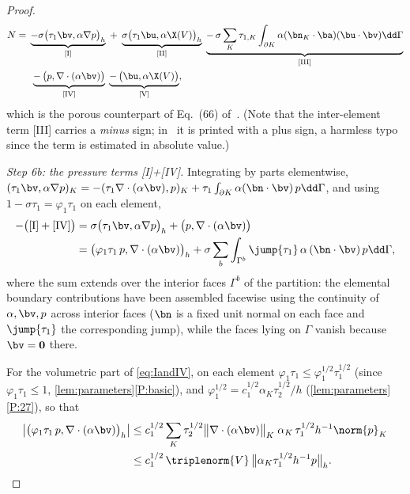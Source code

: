 \begin{proof}
\begin{align}
  N ={}& \underbrace{-\sigma\bigl(\tau_1\bv,\alpha\nabla p\bigr)_h}_{\textup{[I]}}
  \;+\; \underbrace{\sigma\bigl(\tau_1\bu,\alpha\X(V)\bigr)_h}_{\textup{[II]}}
  \;\underbrace{-\,\sigma\sum_{K}\tau_{1,K}\int_{\partial K}
  \alpha(\bn_K\cdot\ba)(\bu\cdot\bv)\dd\Gamma}_{\textup{[III]}}
  \nonumber\\
  &\;\underbrace{-\,\bigl(p,\nabla\cdot(\alpha\bv)\bigr)}_{\textup{[IV]}}
  \;\underbrace{-\,\bigl(\bu,\alpha\X(V)\bigr)}_{\textup{[V]}} ,
  \label{eq:fiveterms}
\end{align}
which is the porous counterpart of Eq.~(66) of~\cite{codina2001stabilized}. (Note that the
inter-element term [III] carries a \emph{minus} sign; in~\cite{codina2001stabilized} it is printed
with a plus sign, a harmless typo since the term is estimated in absolute value.)

\smallskip\noindent\emph{Step 6b: the pressure terms \textup{[I]+[IV]}.}
Integrating by parts elementwise, $(\tau_1\bv,\alpha\nabla p)_K
= -(\tau_1\nabla\cdot(\alpha\bv),p)_K
+ \tau_{1}\int_{\partial K}\alpha(\bn\cdot\bv)\,p\dd\Gamma$, and using
$1-\sigma\tau_{1}=\varphi_{1}\tau_{1}$ on each element,
\begin{equation}\label{eq:IandIV}
\begin{aligned}
  -\bigl(\textup{[I]}+\textup{[IV]}\bigr)
  &= \sigma\bigl(\tau_1\bv,\alpha\nabla p\bigr)_h
  + \bigl(p,\nabla\cdot(\alpha\bv)\bigr) \\
  &= \bigl(\varphi_1\tau_1\,p,\nabla\cdot(\alpha\bv)\bigr)_h
  + \sigma\sum_{b}\int_{\Gamma^b}\jump{\tau_1}\,\alpha\,(\bn\cdot\bv)\,p\dd\Gamma,
\end{aligned}
\end{equation}
where the sum extends over the interior faces $\Gamma^b$ of the partition: the elemental
boundary contributions have been assembled facewise using the continuity of
$\alpha,\bv,p$ across interior faces ($\bn$ is a fixed unit normal on each face and
$\jump{\tau_1}$ the corresponding jump), while the faces lying on $\Gamma$ vanish because
$\bv=\boldsymbol{0}$ there.

For the volumetric part of \eqref{eq:IandIV}, on each element
$\varphi_1\tau_1\le\varphi_1^{1/2}\tau_1^{1/2}$
(since $\varphi_1\tau_1\le1$, \cref{lem:parameters}\ref{P:basic}), and
$\varphi_1^{1/2}=c_1^{1/2}\alpha_K\tau_2^{1/2}/h$
(\cref{lem:parameters}\ref{P:27}), so that
\begin{equation}\label{eq:volpart}
\begin{aligned}
  \bigl|\bigl(\varphi_1\tau_1\,p,\nabla\cdot(\alpha\bv)\bigr)_h\bigr|
  &\le c_1^{1/2}\sum_K
  \tau_2^{1/2}\bigl\lVert\nabla\cdot(\alpha\bv)\bigr\rVert_K\;
  \alpha_K\,\tau_1^{1/2}h^{-1}\norm{p}_K \\
  &\le c_1^{1/2}\,\triplenorm{V}\,
  \bigl\lVert\alpha_K\tau_1^{1/2}h^{-1}p\bigr\rVert_h .
\end{aligned}
\end{equation}


\end{proof}
